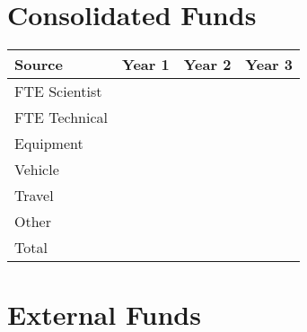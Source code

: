 \documentclass[version=last,
    paper=a4,                               %
    10pt,                                   %
    dvipsnames,
    oneside,                              %
    headings=openany,                       %
    open=any,
    BCOR=7mm,                               %
    DIV=15,     %
]{scrbook}
\begin{document}
\section*{Consolidated Funds }



\begin{longtabu} to \linewidth { |  X | X | X | X | }
\hline
{}
Source & Year 1 & Year 2 & Year 3\\
\hline
\endhead



FTE Scientist &  &  & \\



FTE Technical &  &  & \\



Equipment &  &  & \\



Vehicle &  &  & \\



Travel &  &  & \\



Other &  &  & \\



Total &  &  & \\


\hline
\end{longtabu}



\section*{External Funds }
\end{document}
